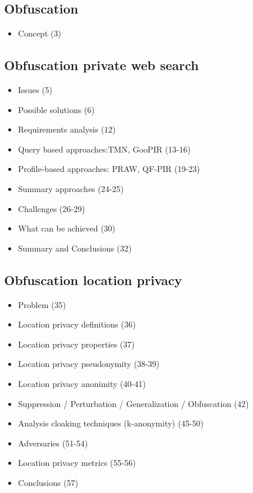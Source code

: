 \documentclass[../overview.tex]{subfiles}
\begin{document}

\subsection{Obfuscation}
\begin{itemize}
	\item Concept (3)
\end{itemize}

\subsection{Obfuscation private web search}
\begin{itemize}
	\item Issues (5)
	\item Possible solutions (6)
	\item Requirements analysis (12)
	\item Query based approaches:TMN, GooPIR (13-16)
	\item Profile-based approaches: PRAW, QF-PIR (19-23)
	\item Summary approaches (24-25)
	\item Challenges (26-29)
	\item What can be achieved (30)
	\item Summary and Conclusions (32)
\end{itemize}

\subsection{Obfuscation location privacy}
\begin{itemize}
	\item Problem (35)
	\item Location privacy definitions (36)
	\item Location privacy properties (37)
	\item Location privacy pseudonymity (38-39)
	\item Location privacy anonimity (40-41)
	\item Suppression / Perturbation / Generalization / Obfuscation (42)
	\item Analysis cloaking techniques (k-anonymity) (45-50)
	\item Adversaries (51-54)
	\item Location privacy metrics (55-56)
	\item Conclusions (57)
\end{itemize}
\end{document}
